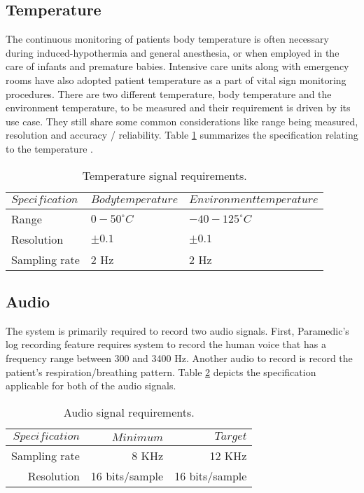 \subsection{Temperature}
\hspace{10mm}The continuous monitoring of patients body temperature is often necessary during induced-hypothermia and general anesthesia, or when employed in the care of infants and premature babies. Intensive care units along with emergency rooms have also adopted patient temperature as a part of vital sign monitoring procedures. There are two different temperature, body temperature and the environment temperature, to be measured and their requirement is driven by its use case. They still share some common considerations like range being measured, resolution and accuracy / reliability.  Table \ref{table:tmp} summarizes the specification relating to the temperature . 
\begin{table}[h]
	\centering
	\begin{tabular}{|l |l|l|}
		\hline
		$Specification$ & $Body temperature$ & $Environment temperature$ \\
		\hline
		Range & $0-50 ^{\circ}C$ & $-40-125 ^{\circ}C$ \\
		Resolution & $\pm 0.1$ & $\pm 0.1$\\
		Sampling rate & 2 Hz & 2 Hz \\
		\hline
	\end{tabular}
	\caption{Temperature signal requirements.}
	\label{table:tmp}
\end{table}

\subsection{Audio}
\hspace{10mm}The system is primarily required to record two audio signals. First, Paramedic's log recording feature requires system to record the human voice that has a frequency range between 300 and 3400 Hz. Another audio to record is record the patient's respiration/breathing pattern. Table \ref{table:aud} depicts the specification applicable for both of the audio signals. 

\begin{table}[h]
	\centering
	\begin{tabular}{|r |r|r|}
		\hline
		$Specification$ & $Minimum$ & $Target$ \\
		\hline
		Sampling rate &  8 KHz & 12 KHz \\
		Resolution & 16 bits/sample & 16 bits/sample \\
		\hline
	\end{tabular}
	\caption{Audio signal requirements.}
	\label{table:aud}
\end{table}
